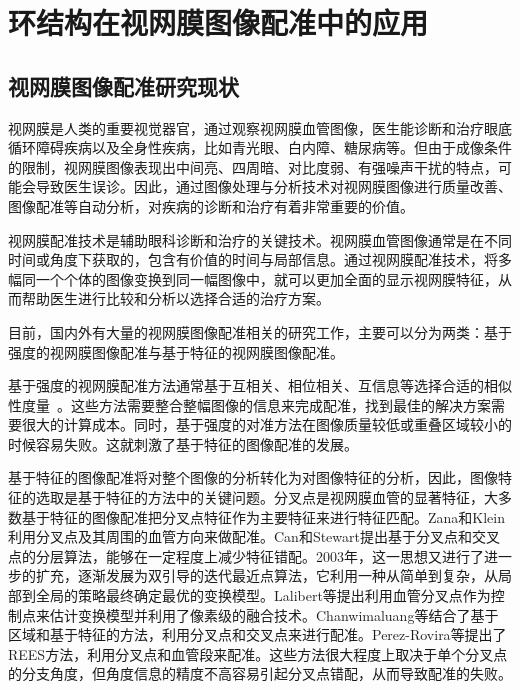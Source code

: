 

\chapter{环结构在视网膜图像配准中的应用}
\label{cha:intro}


\section{视网膜图像配准研究现状}
\label{}

视网膜是人类的重要视觉器官，通过观察视网膜血管图像，医生能诊断和治疗眼底循环障碍疾病以及全身性疾病，比如青光眼、白内障、糖尿病等。但由于成像条件的限制，视网膜图像表现出中间亮、四周暗、对比度弱、有强噪声干扰的特点，可能会导致医生误诊。因此，通过图像处理与分析技术对视网膜图像进行质量改善、图像配准等自动分析，对疾病的诊断和治疗有着非常重要的价值。

视网膜配准技术是辅助眼科诊断和治疗的关键技术。视网膜血管图像通常是在不同时间或角度下获取的，包含有价值的时间与局部信息。通过视网膜配准技术，将多幅同一个个体的图像变换到同一幅图像中，就可以更加全面的显示视网膜特征，从而帮助医生进行比较和分析以选择合适的治疗方案。

目前，国内外有大量的视网膜图像配准相关的研究工作，主要可以分为两类：基于强度的视网膜图像配准与基于特征的视网膜图像配准\cite{oliveira2014medical}。

基于强度的视网膜配准方法通常基于互相关、相位相关、互信息\cite{penney1998comparison}等选择合适的相似性度量~\cite{Glocker02,Nunes03,Dreo04}。这些方法需要整合整幅图像的信息来完成配准，找到最佳的解决方案需要很大的计算成本。同时，基于强度的对准方法在图像质量较低或重叠区域较小的时候容易失败。这就刺激了基于特征的图像配准的发展。

基于特征的图像配准将对整个图像的分析转化为对图像特征的分析\cite{dingnan}，因此，图像特征的选取是基于特征的方法中的关键问题。分叉点是视网膜血管的显著特征，大多数基于特征的图像配准把分叉点特征作为主要特征来进行特征匹配。Zana和Klein\cite{zana1999multimodal}利用分叉点及其周围的血管方向来做配准。Can和Stewart\cite{can2002feature}提出基于分叉点和交叉点的分层算法，能够在一定程度上减少特征错配。2003年，这一思想又进行了进一步的扩充，逐渐发展为双引导的迭代最近点算法\cite{stewart2003dual}，它利用一种从简单到复杂，从局部到全局的策略最终确定最优的变换模型。Lalibert\cite{laliberte2003registration}等提出利用血管分叉点作为控制点来估计变换模型并利用了像素级的融合技术。Chanwimaluang\cite{chanwimaluang2006hybrid}等结合了基于区域和基于特征的方法，利用分叉点和交叉点来进行配准。Perez-Rovira\cite{perez2012rerbee}等提出了REES方法，利用分叉点和血管段来配准。这些方法很大程度上取决于单个分叉点的分支角度，但角度信息的精度不高容易引起分叉点错配，从而导致配准的失败。

